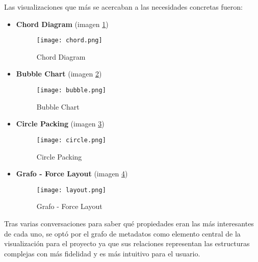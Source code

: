 Las visualizaciones que más se acercaban a las necesidades concretas fueron:
\begin{itemize}
	\item \textbf{Chord Diagram} (imagen \ref{image:corddiagram})
    \begin{figure}[H]
      \centering
    \texttt{[image: chord.png]}
      \caption{Chord Diagram}
      \label{image:corddiagram}
    \end{figure}
    
   	\item \textbf{Bubble Chart} (imagen \ref{image:bubble})
     \begin{figure}[H]
      \centering
    \texttt{[image: bubble.png]}
      \caption{Bubble Chart}
      \label{image:bubble}
    \end{figure}

	\item \textbf{Circle Packing} (imagen \ref{image:packing})
     \begin{figure}[H]
      \centering
    \texttt{[image: circle.png]}
      \caption{Circle Packing}
      \label{image:packing}
    \end{figure}
	\item \textbf{Grafo - Force Layout} (imagen \ref{image:graphlayout})
     \begin{figure}[H]
      \centering
    \texttt{[image: layout.png]}
      \caption{Grafo - Force Layout}
      \label{image:graphlayout}
    \end{figure}
\end{itemize}

Tras varias conversaciones para saber qué propiedades eran las más interesantes de cada uno, se optó por el grafo de \glspl{metadato} como elemento central de la visualización para el proyecto ya que sus relaciones representan las estructuras complejas con más fidelidad y es más intuitivo para el usuario.

\section{}



